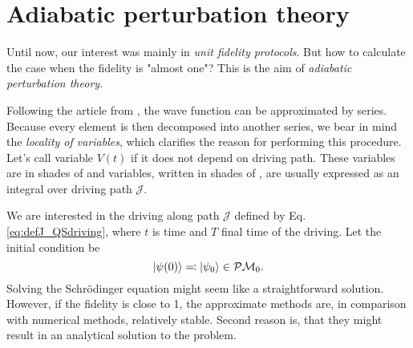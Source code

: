 \section{Adiabatic perturbation theory}
Until now, our interest was mainly in \emph{unit fidelity protocols}. But how to calculate the case when the fidelity is "almost one"? This is the aim of \emph{adiabatic perturbation theory}.


Following the article from \citet{Rigolin2008}, the wave function can be approximated by series. Because every element is then decomposed into another series, we bear in mind the \emph{locality of variables}, which clarifies the reason for performing this procedure. Let's call variable $V(t)$ \emph{} if it does not depend on driving path. These variables are in shades of  and  variables, written in shades of , are usually expressed as an integral over driving path $\mathcal J$.

We are interested in the driving along path $\mathcal J$ defined by Eq. \ref{eq:defJ_QSdriving},
where $t$ is time and $T$ final time of the driving. Let the initial condition be
\begin{equation}
    \ket{\psi(0)}\eqqcolon\ket{\psi_0}\in \mathcal{P}\mathcal{M}_0.
\end{equation}
Solving the Schr\"odinger equation might seem like a straightforward solution. However, if the fidelity is close to 1, the approximate methods are, in comparison with numerical methods, relatively stable. Second reason is, that they might result in an analytical solution to the problem.

